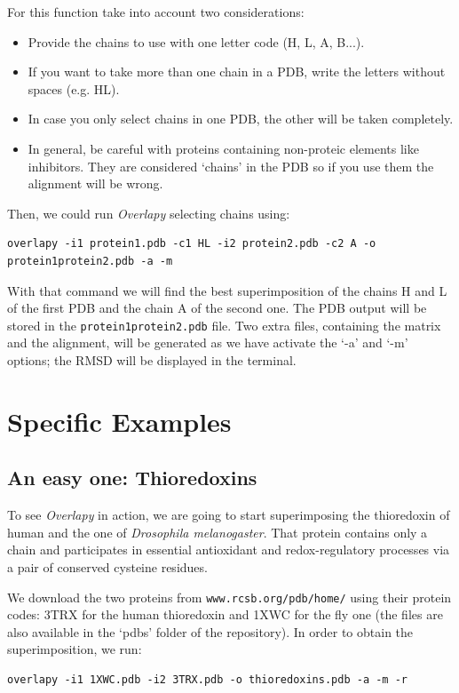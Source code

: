 \documentclass{article}
\begin{document}
For this function take into account two considerations:
\begin{itemize}
\item Provide the chains to use with one letter code (H, L, A, B...).
\item If you want to take more than one chain in a PDB, write the letters without spaces (e.g. HL).
\item In case you only select chains in one PDB, the other will be taken completely. 
\item In general, be careful with proteins containing non-proteic elements like inhibitors. They are considered `chains' in the PDB so if you use them the alignment will be wrong. 
\end{itemize}

Then, we could run \textit{Overlapy} selecting chains using:
\lstset{language=bash}
\begin{lstlisting}
overlapy -i1 protein1.pdb -c1 HL -i2 protein2.pdb -c2 A -o protein1protein2.pdb -a -m
\end{lstlisting}

With that command we will find the best superimposition of the chains H and L of the first PDB and the chain A of the second one. The PDB output will be stored in the \texttt{protein1protein2.pdb} file. Two extra files, containing the matrix and the alignment, will be generated as we have activate the `-a' and `-m' options; the RMSD will be displayed in the terminal.

\section*{Specific Examples}

\subsection*{\color{gray}An easy one: Thioredoxins}

To see \textit{Overlapy} in action, we are going to start superimposing the thioredoxin of human and the one of \textit{Drosophila melanogaster}. That protein contains only a chain and participates in essential antioxidant and redox-regulatory processes via a pair of conserved cysteine residues\cite{20}.

We download the two proteins from \texttt{www.rcsb.org/pdb/home/} using their protein codes: 3TRX for the human thioredoxin and 1XWC for the fly one (the files are also available in the `pdbs' folder of the repository). In order to obtain the superimposition, we run:
\begin{lstlisting}
overlapy -i1 1XWC.pdb -i2 3TRX.pdb -o thioredoxins.pdb -a -m -r
\end{lstlisting}
\end{document}
